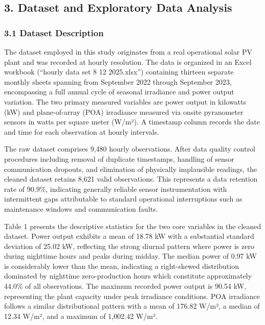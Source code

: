 \documentclass[
  11pt,
]{article}
\begin{document}
\subsection{3. Dataset and Exploratory Data
Analysis}\label{dataset-and-exploratory-data-analysis}

\subsubsection{3.1 Dataset Description}\label{dataset-description}

The dataset employed in this study originates from a real operational
solar PV plant and was recorded at hourly resolution. The data is
organized in an Excel workbook (“hourly data set 8 12 2025.xlsx”)
containing thirteen separate monthly sheets spanning from September 2022
through September 2023, encompassing a full annual cycle of seasonal
irradiance and power output variation. The two primary measured
variables are power output in kilowatts (kW) and plane-of-array (POA)
irradiance measured via onsite pyranometer sensors in watts per square
meter (W/m²). A timestamp column records the date and time for each
observation at hourly intervals.

The raw dataset comprises 9,480 hourly observations. After data quality
control procedures including removal of duplicate timestamps, handling
of sensor communication dropouts, and elimination of physically
implausible readings, the cleaned dataset retains 8,621 valid
observations. This represents a data retention rate of 90.9\%,
indicating generally reliable sensor instrumentation with intermittent
gaps attributable to standard operational interruptions such as
maintenance windows and communication faults.

Table 1 presents the descriptive statistics for the two core variables
in the cleaned dataset. Power output exhibits a mean of 18.78 kW with a
substantial standard deviation of 25.02 kW, reflecting the strong
diurnal pattern where power is zero during nighttime hours and peaks
during midday. The median power of 0.97 kW is considerably lower than
the mean, indicating a right-skewed distribution dominated by nighttime
zero-production hours which constitute approximately 44.0\% of all
observations. The maximum recorded power output is 90.54 kW,
representing the plant capacity under peak irradiance conditions. POA
irradiance follows a similar distributional pattern with a mean of
176.82 W/m², a median of 12.34 W/m², and a maximum of 1,002.42 W/m².
\end{document}
